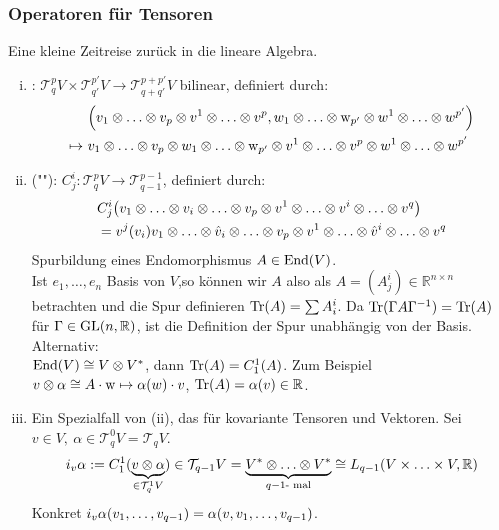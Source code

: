 \subsubsection{Operatoren für Tensoren}
\label{ssub:176}
Eine kleine Zeitreise zurück in die lineare Algebra.
\begin{enumerate}[(i)]
\item {}: $\mathcal{T}_q^p V \times \mathcal{T}_{q'}^{p'} V \to \mathcal{T}_{q+q'}^{p+p'	} V$ bilinear, definiert durch:
\begin{align*}
&\enbrace*{v_1\otimes \ldots \otimes v_p \otimes v^1 \otimes \ldots \otimes v^p, w_1\otimes \ldots \otimes \w_{p'} \otimes w^1 \otimes \ldots \otimes w^{p'}}\\
\mapsto\ &v_1\otimes \ldots \otimes v_p \otimes w_1\otimes \ldots \otimes \w_{p'}\otimes v^1 \otimes \ldots \otimes v^p \otimes w^1 \otimes \ldots \otimes w^{p'}
\end{align*}
\item {} (""): $C_j^i: \mathcal{T}_q^p V \to \mathcal{T}_{q-1}^{p-1}$, definiert durch:
\begin{align*}
&C_j^i\enbrace*{v_1\otimes \ldots \otimes v_i \otimes \ldots \otimes v_p \otimes v^1\otimes \ldots \otimes v^i \otimes \ldots \otimes v^q}\\
&= v^j(v_i) v_1\otimes \ldots \otimes \hat{v}_i \otimes \ldots \otimes v_p \otimes v^1\otimes \ldots \otimes \hat{v}^i \otimes \ldots \otimes v^q
\end{align*}
Spurbildung eines Endomorphismus $A\in \operatorname{End}(V)$.\\
Ist $e_1,\ldots, e_n$ Basis von $V$,so können wir $A$ also als $A = (A_j^i)\in \mathds{R}^{n\times n}$ betrachten und die Spur definieren $\operatorname{Tr}(A) = \sum A_i^i$. Da $\operatorname{Tr}(\Gamma A \Gamma^{-1}) = \operatorname{Tr}(A)$ für $\Gamma \in \operatorname{GL}(n,\mathbb{R})$, ist die Definition der Spur unabhängig von der Basis.\\
Alternativ:\\
$\operatorname{End}(V) \cong V\otimes V^*$, dann $\operatorname{Tr}(A) = C_1^1(A)$. Zum Beispiel $v\otimes \alpha \cong A\cdot \mathrm{w} \mapsto \alpha(w)\cdot v$, $\operatorname{Tr}(A) = \alpha(v) \in \mathbb{R}$.
\item Ein Spezialfall von (ii), das  für kovariante Tensoren und Vektoren. Sei $v\in V,\ \alpha\in \mathcal{T}_q^0 V = \mathcal{T}_q V$.
\[
i_v \alpha := C_1^1(\underbrace{v\otimes \alpha}_{\in \mathcal{T}_q^1 V}) \in \mathcal{T}_{q-1} V = \underbrace{V^*\otimes \ldots \otimes V^*}_{q-1 \text{- mal}} \cong L_{q-1}(V\times \ldots \times V,\mathbb{R})
\]
Konkret $i_v \alpha(v_1,\ldots,v_{q-1}) = \alpha(v,v_1,\ldots,v_{q-1})$.
\end{enumerate}
